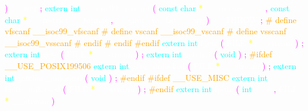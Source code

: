 \textcolor{magenta}{)} 
\textcolor{white}{\_\_wur} 
\textcolor{magenta}{;} 
\textcolor{cyan}{extern} 
\textcolor{cyan}{int} 
\textcolor{white}{\_\_isoc99\_vsscanf} 
\textcolor{magenta}{(} 
\textcolor{cyan}{const} 
\textcolor{cyan}{char} 
\textcolor{yellow}{*} 
\textcolor{white}{\_\_restrict} 
\textcolor{white}{\_\_s} 
\textcolor{magenta}{,} 
\textcolor{cyan}{const} 
\textcolor{cyan}{char} 
\textcolor{yellow}{*} 
\textcolor{white}{\_\_restrict} 
\textcolor{white}{\_\_format} 
\textcolor{magenta}{,} 
\textcolor{white}{\_\_gnuc\_va\_list} 
\textcolor{white}{\_\_arg} 
\textcolor{magenta}{)} 
\textcolor{white}{\_\_THROW} 
\textcolor{magenta}{;} 
\textcolor{orange}{\# define vfscanf \_\_isoc99\_vfscanf} 
\textcolor{orange}{\# define vscanf \_\_isoc99\_vscanf} 
\textcolor{orange}{\# define vsscanf \_\_isoc99\_vsscanf} 
\textcolor{orange}{\# endif} 
\textcolor{orange}{\# endif} 
\textcolor{orange}{\#endif} 
\textcolor{cyan}{extern} 
\textcolor{cyan}{int} 
\textcolor{white}{fgetc} 
\textcolor{magenta}{(} 
\textcolor{white}{FILE} 
\textcolor{yellow}{*} 
\textcolor{white}{\_\_stream} 
\textcolor{magenta}{)} 
\textcolor{magenta}{;} 
\textcolor{cyan}{extern} 
\textcolor{cyan}{int} 
\textcolor{white}{getc} 
\textcolor{magenta}{(} 
\textcolor{white}{FILE} 
\textcolor{yellow}{*} 
\textcolor{white}{\_\_stream} 
\textcolor{magenta}{)} 
\textcolor{magenta}{;} 
\textcolor{cyan}{extern} 
\textcolor{cyan}{int} 
\textcolor{white}{getchar} 
\textcolor{magenta}{(} 
\textcolor{cyan}{void} 
\textcolor{magenta}{)} 
\textcolor{magenta}{;} 
\textcolor{orange}{\#ifdef \_\_USE\_POSIX199506} 
\textcolor{cyan}{extern} 
\textcolor{cyan}{int} 
\textcolor{white}{getc\_unlocked} 
\textcolor{magenta}{(} 
\textcolor{white}{FILE} 
\textcolor{yellow}{*} 
\textcolor{white}{\_\_stream} 
\textcolor{magenta}{)} 
\textcolor{magenta}{;} 
\textcolor{cyan}{extern} 
\textcolor{cyan}{int} 
\textcolor{white}{getchar\_unlocked} 
\textcolor{magenta}{(} 
\textcolor{cyan}{void} 
\textcolor{magenta}{)} 
\textcolor{magenta}{;} 
\textcolor{orange}{\#endif} 
\textcolor{orange}{\#ifdef \_\_USE\_MISC} 
\textcolor{cyan}{extern} 
\textcolor{cyan}{int} 
\textcolor{white}{fgetc\_unlocked} 
\textcolor{magenta}{(} 
\textcolor{white}{FILE} 
\textcolor{yellow}{*} 
\textcolor{white}{\_\_stream} 
\textcolor{magenta}{)} 
\textcolor{magenta}{;} 
\textcolor{orange}{\#endif} 
\textcolor{cyan}{extern} 
\textcolor{cyan}{int} 
\textcolor{white}{fputc} 
\textcolor{magenta}{(} 
\textcolor{cyan}{int} 
\textcolor{white}{\_\_c} 
\textcolor{magenta}{,} 
\textcolor{white}{FILE} 
\textcolor{yellow}{*} 
\textcolor{white}{\_\_stream} 
\textcolor{magenta}{)} 
